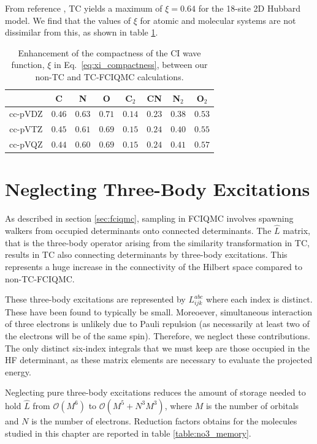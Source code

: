 From reference , TC yields a maximum of $\xi=0.64$ for the 18-site 2D Hubbard model. We find that the values of $\xi$ for atomic and molecular systems are not dissimilar from this, as shown in table \ref{table:l2_norms}.
%
\begin{table}[htbp]
    \centering
    \begin{tabular}{cccccccc}
            & C      & N      & O      &
              C$_2$  & CN     & N$_2$  & O$_2$  \\
    \hline \hline
    cc-pVDZ & $0.46$ & $0.63$ & $0.71$
            & $0.14$ & $0.23$ & $0.38$ & $0.53$ \\
    cc-pVTZ & $0.45$ & $0.61$ & $0.69$
            & $0.15$ & $0.24$ & $0.40$ & $0.55$ \\
    cc-pVQZ & $0.44$ & $0.60$ & $0.69$
            & $0.15$ & $0.24$ & $0.41$ & $0.57$ \\
    \hline
    \end{tabular}
    \caption{
      Enhancement of the compactness of the CI wave function, $\xi$ in
      Eq.\ \ref{eq:xi_compactness}, between our non-TC and TC-FCIQMC
      calculations.
    }
    \label{table:l2_norms}
  \end{table}

\section{Neglecting Three-Body Excitations}

As described in section \ref{sec:fciqmc}, sampling in FCIQMC involves spawning walkers from occupied determinants onto connected determinants. The $\hat L$ matrix, that is the three-body operator arising from the similarity transformation in TC, results in TC also connecting determinants by three-body excitations. This represents a huge increase in the connectivity of the Hilbert space compared to non-TC-FCIQMC.

These three-body excitations are represented by $L_{ijk}^{abc}$ where each index is distinct. These have been found to typically be small. Moreoever, simultaneous interaction of three electrons is unlikely due to Pauli repulsion (as necessarily at least two of the electrons will be of the same spin). Therefore, we neglect these contributions. The only distinct six-index integrals that we must keep are those occupied in the HF determinant, as these matrix elements are necessary to evaluate the projected energy.

Neglecting pure three-body excitations reduces the amount of storage needed to hold $\hat L$ from $\mathcal{O}(M^6)$ to $\mathcal{O}(M^5+N^3M^3)$, where $M$ is the number of orbitals and $N$ is the number of electrons. Reduction factors obtains for the molecules studied in this chapter are reported in table \ref{table:no3_memory}.

